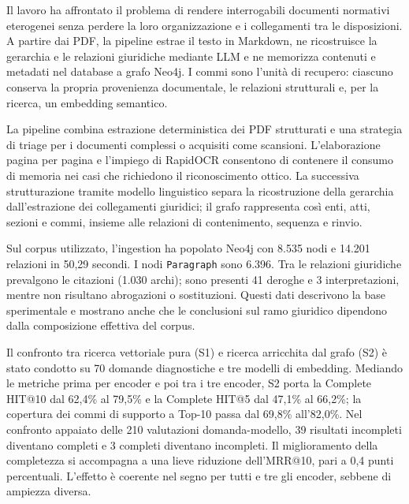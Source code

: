 \newpage
\pagestyle{conclusions}

Il lavoro ha affrontato il problema di rendere interrogabili documenti normativi eterogenei senza perdere la loro organizzazione e i collegamenti tra le disposizioni. A partire dai PDF, la pipeline estrae il testo in Markdown, ne ricostruisce la gerarchia e le relazioni giuridiche mediante LLM e ne memorizza contenuti e metadati nel database a grafo Neo4j. I commi sono l'unità di recupero: ciascuno conserva la propria provenienza documentale, le relazioni strutturali e, per la ricerca, un embedding semantico.


La pipeline combina estrazione deterministica dei PDF strutturati e una strategia di triage per i documenti complessi o acquisiti come scansioni. L'elaborazione pagina per pagina e l'impiego di RapidOCR consentono di contenere il consumo di memoria nei casi che richiedono il riconoscimento ottico. La successiva strutturazione tramite modello linguistico separa la ricostruzione della gerarchia dall'estrazione dei collegamenti giuridici; il grafo rappresenta così enti, atti, sezioni e commi, insieme alle relazioni di contenimento, sequenza e rinvio.

Sul corpus utilizzato, l'ingestion ha popolato Neo4j con 8.535 nodi e 14.201 relazioni in 50,29 secondi. I nodi \texttt{Paragraph} sono 6.396. Tra le relazioni giuridiche prevalgono le citazioni (1.030 archi); sono presenti 41 deroghe e 3 interpretazioni, mentre non risultano abrogazioni o sostituzioni. Questi dati descrivono la base sperimentale e mostrano anche che le conclusioni sul ramo giuridico dipendono dalla composizione effettiva del corpus.

Il confronto tra ricerca vettoriale pura (S1) e ricerca arricchita dal grafo (S2) è stato condotto su 70 domande diagnostiche e tre modelli di embedding. Mediando le metriche prima per encoder e poi tra i tre encoder, S2 porta la Complete HIT@10 dal 62,4\% al 79,5\% e la Complete HIT@5 dal 47,1\% al 66,2\%; la copertura dei commi di supporto a Top-10 passa dal 69,8\% all'82,0\%. Nel confronto appaiato delle 210 valutazioni domanda-modello, 39 risultati incompleti diventano completi e 3 completi diventano incompleti. Il miglioramento della completezza si accompagna a una lieve riduzione dell'MRR@10, pari a 0,4 punti percentuali. L'effetto è coerente nel segno per tutti e tre gli encoder, sebbene di ampiezza diversa.

